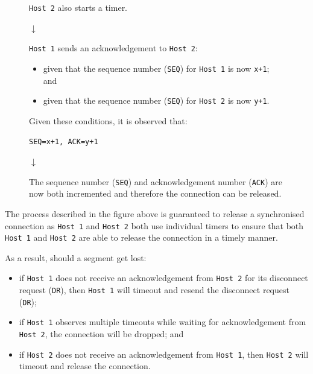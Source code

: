\documentclass[a4paper]{systems-software}
\begin{document}
\begin{figure}[H]
{\begin{minipage}{\dimexpr \textwidth-2\fboxsep-2\fboxrule}
			\texttt{Host 2} also starts a timer.
			
			\begin{center}
				$\downarrow$
			\end{center}
			
			\texttt{Host 1} sends an acknowledgement to \texttt{Host 2}:
			\begin{itemize}
				\item given that the sequence number (\texttt{SEQ}) for \texttt{Host 1} is now \texttt{x+1}; and
				\item given that the sequence number (\texttt{SEQ}) for \texttt{Host 2} is now \texttt{y+1}.
			\end{itemize}
			
			Given these conditions, it is observed that:
			
			\texttt{SEQ=x+1, ACK=y+1}
			
			\begin{center}
				$\downarrow$
			\end{center}
		
			The sequence number (\texttt{SEQ}) and acknowledgement number (\texttt{ACK}) are now both incremented and therefore the connection can be released.
	\end{minipage}}
\end{figure}

The process described in the figure above is guaranteed to release a synchronised connection as \texttt{Host 1} and \texttt{Host 2} both use individual timers to ensure that both \texttt{Host 1} and \texttt{Host 2} are able to release the connection in a timely manner.

As a result, should a segment get lost:
\begin{itemize}
	\item if \texttt{Host 1} does not receive an acknowledgement from \texttt{Host 2} for its disconnect request (\texttt{DR}), then \texttt{Host 1} will timeout and resend the disconnect request (\texttt{DR});
	\item if \texttt{Host 1} observes multiple timeouts while waiting for acknowledgement from \texttt{Host 2}, the connection will be dropped; and
	\item if \texttt{Host 2} does not receive an acknowledgement from \texttt{Host 1}, then \texttt{Host 2} will timeout and release the connection.
\end{itemize}
\end{document}
